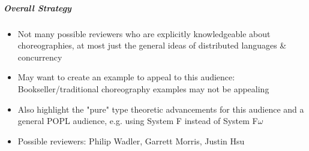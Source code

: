 \documentclass{article}
\theoremstyle{definition}
\begin{document}
\subparagraph{Overall Strategy}
\begin{itemize}
	\item Not many possible reviewers who are explicitly knowledgeable about choreographies, at most just the general ideas of distributed languages \& concurrency
	\item May want to create an example to appeal to this audience: Bookseller/traditional choreography examples may not be appealing
	\item Also highlight the "pure" type theoretic advancements for this audience and a general POPL audience, e.g. using System F instead of System F$\omega$
	\item Possible reviewers: Philip Wadler, Garrett Morris, Justin Hsu
\end{itemize}
\end{document}
